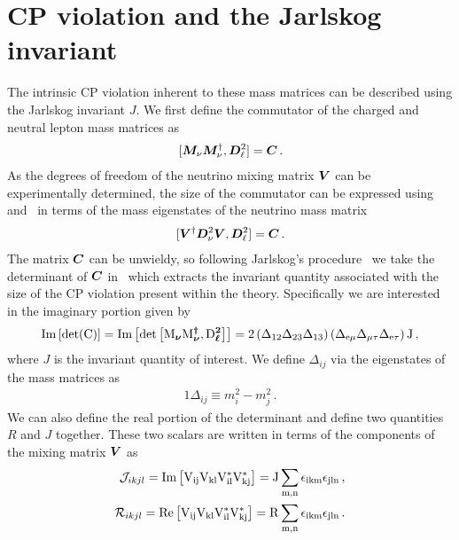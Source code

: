 \section{CP violation and the Jarlskog invariant}\label{sec:jscalar}
\noindent The intrinsic CP violation inherent to these mass matrices can be described using the Jarlskog invariant $J$. We first define the commutator of the charged and neutral lepton mass matrices as 
\begin{alignat}{1}
	\label{comm:1} [\boldsymbol{M}_{\nu}\boldsymbol{M}_{\nu}^{\dagger},\boldsymbol{D}_{\ell}^{2}] = \boldsymbol{C}\,.
\end{alignat}
As the degrees of freedom of the neutrino mixing matrix $\boldsymbol{V}$ can be experimentally determined, the size of the commutator can be expressed using~ and~ in terms of the mass eigenstates of the neutrino mass matrix
\begin{alignat}{1}
	\label{comm:2} [\boldsymbol{V}^{\dagger}\boldsymbol{D}_{\nu}^{2}\boldsymbol{V},\boldsymbol{D}_{\ell}^{2}] = \boldsymbol{C}\,.
\end{alignat}
The matrix $\boldsymbol{C}$ can be unwieldy, so following Jarlskog's procedure~\citep{jarlskog1985commutator,jarlskog1985basis,jarlskog2005invariants} we take the determinant of $\boldsymbol{C}$ in~ which extracts the invariant quantity associated with the size of the CP violation present within the theory. Specifically we are interested in the imaginary portion given by
\begin{alignat}{1}
	\label{det:1} \rm{Im}\left[\rm{det}(\boldsymbol{C})\right]=\rm{Im}\left[\rm{det}\left[\boldsymbol{M_{\nu}}\boldsymbol{M_{\nu}^{\dagger}},\boldsymbol{D_{\ell}^{2}}\right]\right]=2\left(\Delta_{12}\Delta_{23}\Delta_{13}\right)\left(\Delta_{e\mu}\Delta_{\mu\tau}\Delta_{e\tau}\right)J\,,
\end{alignat}
where $J$ is the invariant quantity of interest. We define $\Delta_{ij}$ via the eigenstates of the mass matrices as
\begin{alignat}{1}
	\label{delta:1} \Delta_{ij}\equiv m^{2}_{i}-m^{2}_{j}\,.
\end{alignat}
We can also define the real portion of the determinant and define two quantities $R$ and $J$ together. These two scalars are written in terms of the components of the mixing matrix $\boldsymbol{V}$ as
\begin{alignat}{1}
	\label{j:1}
    {\mathcal J}_{ikjl} = \rm{Im}\left[V_{ij}V_{kl}V^{*}_{il}V^{*}_{kj}\right]=J\sum_{m,n}\epsilon_{ikm}\epsilon_{jln}\,,\\
    \label{j:2}
    {\mathcal R}_{ikjl} = \rm{Re}\left[V_{ij}V_{kl}V^{*}_{il}V^{*}_{kj}\right]=R\sum_{m,n}\epsilon_{ikm}\epsilon_{jln}\,.
\end{alignat}
